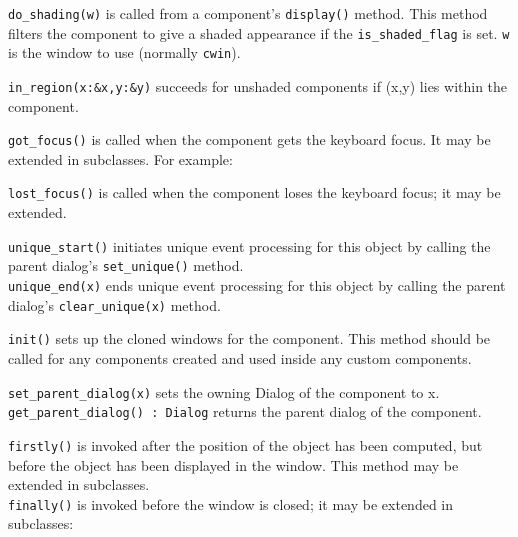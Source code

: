 \texttt{do\_shading(w)} is called from a component's
\texttt{display()}
method. This method filters the component to give a shaded appearance
if the \texttt{is\_shaded\_flag} is set. \texttt{w} is the window to
use (normally \texttt{cwin}).

\texttt{in\_region(x:\&x,y:\&y)} succeeds for unshaded components if
(x,y) lies within the component.

\texttt{got\_focus()} is called when the component gets the keyboard focus. It
may be extended in subclasses. For example:


\texttt{lost\_focus()} is called when the component loses the keyboard focus; it
may be extended.

\texttt{unique\_start()} initiates unique event processing for this object by
calling the parent dialog's \texttt{set\_unique()}
method.\\
\texttt{unique\_end(x)} ends unique event processing for this object by calling
the parent dialog's \texttt{clear\_unique(x)} method.

\texttt{init()} sets up the cloned windows for the component. This method should
be called for any components created and used inside any custom
components.

\texttt{set\_parent\_dialog(x)} sets the owning Dialog of the component to
x.\\
\texttt{get\_parent\_dialog() : Dialog} returns the parent dialog of the
component.

\texttt{firstly()} is invoked after the position of the object has been
computed,
but before the object has been displayed in the window. This method may
be extended in subclasses.\\
\texttt{finally()} is invoked before the window is closed; it may
be extended in subclasses:


